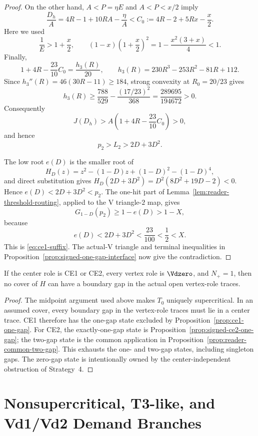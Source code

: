 \begin{proof}
On the other hand, $A<P=\eta E$ and $A<P<x/2$ imply
\[
 \frac{D_h}{A}
 =4R-1+10RA-\frac{\eta}{A}
 <C_0:=4R-2+5Rx-\frac x2.
\]
Here we used
\[
 \frac1E>1+\frac x2,
 \qquad
 (1-x)\left(1+\frac x2\right)^2
 =1-\frac{x^2(3+x)}4<1.
\]
Finally,
\[
 1+4R-\frac{23}{10}C_0=\frac{h_3(R)}{20},
 \qquad
 h_3(R)=230R^3-253R^2-81R+112.
\]
Since $h_3''(R)=46(30R-11)\ge184$, strong convexity at $R_0=20/23$
gives
\[
 h_3(R)\ge
 \frac{788}{529}-\frac{(17/23)^2}{368}
 =\frac{289695}{194672}>0.
\]
Consequently
\[
 J(D_h)>A\left(1+4R-\frac{23}{10}C_0\right)>0,
\]
and hence
\[
 p_2>L_2>2D+3D^2.
\]

The low root $e(D)$ is the smaller root of
\[
 H_D(z)=z^2-(1-D)z+(1-D)^2-(1-D)^4,
\]
and direct substitution gives
$H_D(2D+3D^2)=D^2(8D^2+19D-2)<0$.  Hence
$e(D)<2D+3D^2<p_2$.  The one-hit part of
Lemma~\ref{lem:reader-threshold-routing}, applied to the V triangle-$2$ map, gives
\[
 G_{1-D}(p_2)\ge1-e(D)>1-X,
\]
because
\[
 e(D)<2D+3D^2<\frac{23}{100}<\frac12<X.
\]
This is \eqref{eq:ce1-suffix}.  The actual-V triangle and terminal inequalities in
Proposition~\ref{prop:signed-one-gap-interface} now give the contradiction.
\end{proof}

\begin{proposition}[Positive-gap all-$\Vdzero$, $N_+=1$]
\label{prop:nplus-one-all-vd0}
If the center role is CE1 or CE2, every vertex role is $\Vdzero$, and
$N_+=1$, then no cover of $H$ can have a boundary gap in the actual open
vertex-role traces.
\end{proposition}

\begin{proof}
The midpoint argument used above makes $T_0$ uniquely supercritical.  In an
assumed cover, every boundary gap in the vertex-role traces must lie in a
center trace.  CE1 therefore has the one-gap state excluded by
Proposition~\ref{prop:ce1-one-gap}.  For CE2, the exactly-one-gap state is
Proposition~\ref{prop:signed-ce2-one-gap}; the two-gap state is the common
application in Proposition~\ref{prop:reader-common-two-gap}.  This
exhausts the one- and two-gap states, including singleton gaps.  The zero-gap
state is intentionally owned by the center-independent obstruction of
Strategy~4.
\end{proof}

\section{Nonsupercritical, T3-like, and Vd1/Vd2 Demand Branches}
\label{sec:t3-vd-demand-branches}

